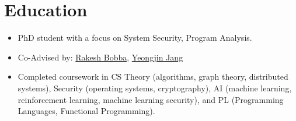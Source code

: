 \section{Education}
{
    \begin{itemize}
        \item PhD student with a focus on System Security, Program Analysis.
        \item Co-Advised by:
              \href{https://eecs.oregonstate.edu/people/bobba-rakesh}{Rakesh
                  Bobba},
              \href{https://www.unexploitable.systems/}{Yeongjin Jang}
        \item Completed coursework in CS Theory (algorithms, graph theory,
              distributed systems), Security (operating systems, cryptography),
              AI (machine learning, reinforcement learning, machine learning
              security), and PL (Programming Languages, Functional Programming).
    \end{itemize}
}
